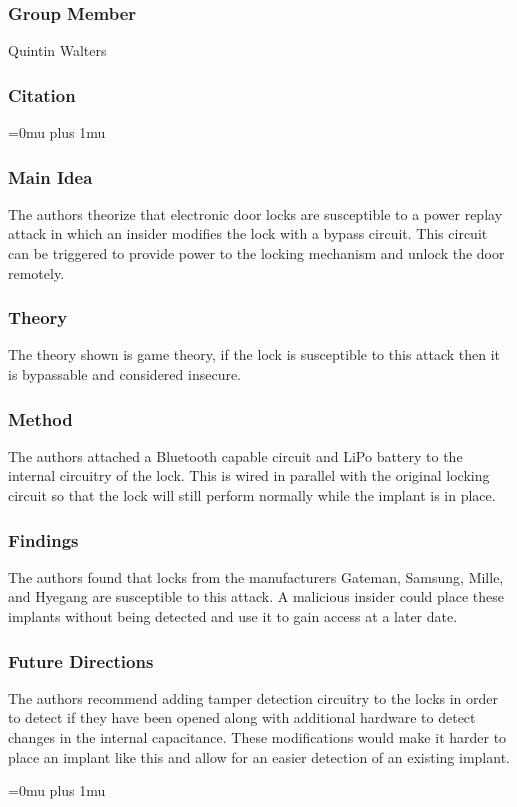 \subsubsection{Group Member}

\noindent
Quintin Walters

\noindent
\subsubsection{Citation}

\Urlmuskip=0mu plus 1mu\relax

\subsubsection{Main Idea}

\noindent
The authors theorize that electronic door locks are susceptible to a power replay attack in which an insider modifies the lock with a bypass circuit.  This circuit can be triggered to provide power to the locking mechanism and unlock the door remotely.

\subsubsection{Theory}

\noindent
The theory shown is game theory, if the lock is susceptible to this attack then it is bypassable and considered insecure.

\subsubsection{Method}

\noindent
The authors attached a Bluetooth capable circuit and LiPo battery to the internal circuitry of the lock.  This is wired in parallel with the original locking circuit so that the lock will still perform normally while the implant is in place.

\subsubsection{Findings}

\noindent
The authors found that locks from the manufacturers Gateman, Samsung, Mille, and Hyegang are susceptible to this attack.  A malicious insider could place these implants without being detected and use it to gain access at a later date.

\subsubsection{Future Directions}

\noindent
The authors recommend adding tamper detection circuitry to the locks in order to detect if they have been opened along with additional hardware to detect changes in the internal capacitance.  These modifications would make it harder to place an implant like this and allow for an easier detection of an existing implant.

\Urlmuskip=0mu plus 1mu\relax
\pagebreak
